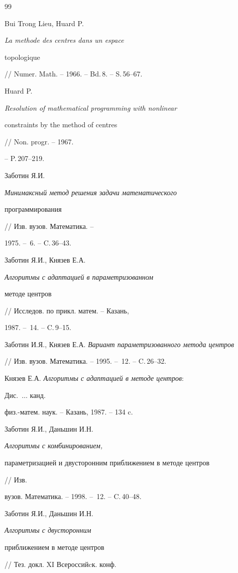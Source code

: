 \begin{thebibliography}{99}







Bui Trong Lieu, Huard P. {\em La methode des centres dans un espace 


topologique} // Numer. Math. -- 1966. -- Bd.\,8. -- S.\,56--67.




Huard P. {\em Resolution of mathematical programming with nonlinear 


constraints by the method of centres} // Non. progr. -- 1967.


-- P.\,207--219.




Заботин Я.И. {\em Минимаксный метод решения задачи математического 


программирования} // Изв. вузов. Математика. --


1975. -- \No\,6. -- C.\,36--43.




Заботин Я.И., Князев Е.А. {\em Алгоритмы с адаптацией в параметризованном 


методе центров} // Исследов. по прикл. матем. -- Казань,


1987. -- \No\,14. -- C.\,9--15.




Заботин И.Я., Князев Е.А. {\em Вариант параметризованного метода центров}


// Изв. вузов. Математика. -- 1995. -- \No\,12. -- C.\,26--32.




Князев Е.А. {\em Алгоритмы с адаптацией в методе центров}:


Дис.~$\dotsc$ канд. 


физ.-матем. наук. -- Казань, 1987. -- 134 c.




Заботин Я.И., Даньшин И.Н. {\em Алгоритмы с комбинированием, 


параметризацией и двусторонним приближением в методе центров} // Изв. 


вузов. Математика. -- 1998. -- \No\,12. -- C.\,40--48.




Заботин Я.И., Даньшин И.Н. {\em Алгоритмы с двусторонним


приближением в методе центров} // Тез. докл. XI Всероссийcк. конф.



\end{thebibliography}
